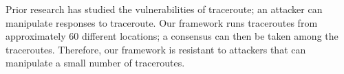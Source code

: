 Prior research has studied the vulnerabilities of traceroute; an attacker can manipulate responses to traceroute.  Our framework runs traceroutes from approximately 60 different locations; a consensus can then be taken among the traceroutes.  Therefore, our framework is resistant to attackers that can manipulate a small number of traceroutes.  


